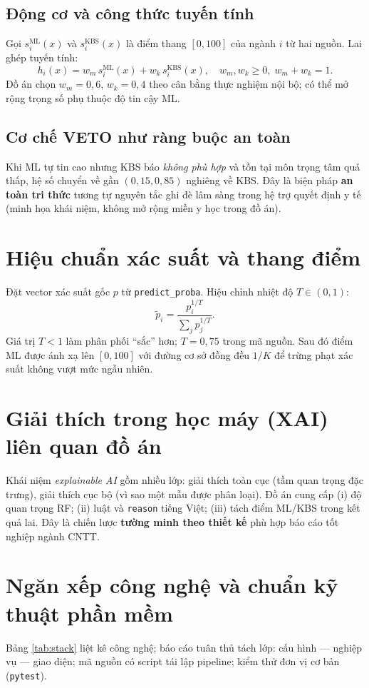 \subsection{Động cơ và công thức tuyến tính}
Gọi $s^{\text{ML}}_i(x)$ và $s^{\text{KBS}}_i(x)$ là điểm thang $[0,100]$ của ngành $i$ từ hai nguồn. Lai ghép tuyến tính:
\begin{equation}
h_i(x) = w_m\, s^{\text{ML}}_i(x) + w_k\, s^{\text{KBS}}_i(x), \quad w_m,w_k \geq 0,\; w_m+w_k=1.
\label{eq:fusion}
\end{equation}
Đồ án chọn $w_m=0{,}6$, $w_k=0{,}4$ theo cân bằng thực nghiệm nội bộ; có thể mở rộng trọng số phụ thuộc độ tin cậy ML.

\subsection{Cơ chế VETO như ràng buộc an toàn}
Khi ML tự tin cao nhưng KBS báo \textit{không phù hợp} và tồn tại môn trọng tâm quá thấp, hệ số chuyển về gần $(0{,}15,0{,}85)$ nghiêng về KBS. Đây là biện pháp \textbf{an toàn tri thức} tương tự nguyên tắc ghi đè lâm sàng trong hệ trợ quyết định y tế (minh họa khái niệm, không mở rộng miền y học trong đồ án).

\section{Hiệu chuẩn xác suất và thang điểm}
Đặt vector xác suất gốc $p$ từ \texttt{predict\_proba}. Hiệu chỉnh nhiệt độ $T\in(0,1)$:
\begin{equation}
\tilde{p}_i = \frac{p_i^{1/T}}{\sum_j p_j^{1/T}}.
\end{equation}
Giá trị $T<1$ làm phân phối ``sắc'' hơn; $T=0{,}75$ trong mã nguồn. Sau đó điểm ML được ánh xạ lên $[0,100]$ với đường cơ sở đồng đều $1/K$ để trừng phạt xác suất không vượt mức ngẫu nhiên.

\section{Giải thích trong học máy (XAI) liên quan đồ án}
Khái niệm \textit{explainable AI} gồm nhiều lớp: giải thích toàn cục (tầm quan trọng đặc trưng), giải thích cục bộ (vì sao một mẫu được phân loại). Đồ án cung cấp (i) độ quan trọng RF; (ii) luật và \texttt{reason} tiếng Việt; (iii) tách điểm ML/KBS trong kết quả lai. Đây là chiến lược \textbf{tường minh theo thiết kế} phù hợp báo cáo tốt nghiệp ngành CNTT.

\section{Ngăn xếp công nghệ và chuẩn kỹ thuật phần mềm}
Bảng \ref{tab:stack} liệt kê công nghệ; báo cáo tuân thủ tách lớp: cấu hình --- nghiệp vụ --- giao diện; mã nguồn có script tái lập pipeline; kiểm thử đơn vị cơ bản (\texttt{pytest}).

